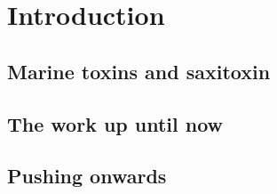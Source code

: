 \chapter{Introduction}


\section{Marine toxins and saxitoxin}

\blindtext[8]


\section{The work up until now}

\blindtext[5]


\section{Pushing onwards}

\blindtext[5]
